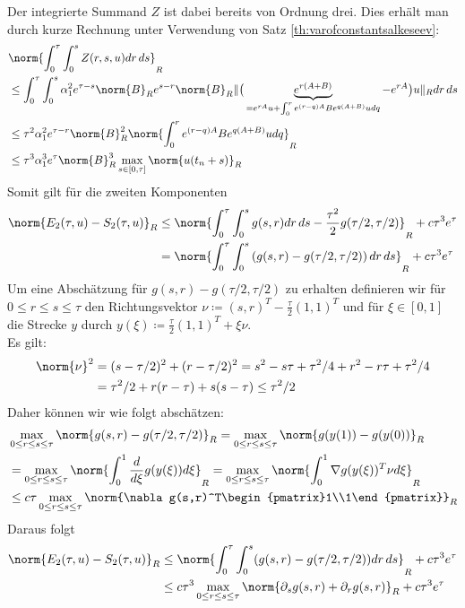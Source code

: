 Der integrierte Summand $Z$ ist dabei bereits von Ordnung drei. Dies erhält man durch kurze Rechnung unter Verwendung von Satz \ref{th:varofconstantsalkeseev}:
\begin{align*}
&\norm{\int_0^\tau\int_0^s Z(r,s,u)dr\,ds}_R\\
&\le \int_0^\tau\int_0^s \alpha_1^2e^{\tau-s}\norm{B}_Re^{s-r}\norm{B}_R\lVert\big(\underbrace{e^{r(A+B)}}_{=e^{rA}u+\int_0^r e^{(r-q)A}Be^{q(A+B)}udq}-e^{rA}\big)u\rVert_Rdr\,ds\\
&\le \tau^2\alpha_1^2e^{\tau-r}\norm{B}_R^2\norm{\int_0^re^{(r-q)A}Be^{q(A+B)}udq}_R\\
&\le \tau^3\alpha_1^3e^{\tau}\norm{B}_R^3\max_{s\in[0,\tau]}\norm{u(t_n+s)}_R
\end{align*} 
Somit gilt für die zweiten Komponenten
\begin{align*}
\norm{E_2(\tau,u)-S_2(\tau,u)}_R&\le \norm{\int_0^\tau\int_0^sg(s,r)dr\,ds-\frac{\tau^2}{2}g(\tau/2,\tau/2)}_R+c\tau^3e^\tau\\
&=\norm{\int_0^\tau\int_0^s\left(g(s,r)-g(\tau/2,\tau/2)\right)dr\,ds}_R+c\tau^3e^\tau
\end{align*}
Um eine Abschätzung für $g(s,r)-g(\tau/2,\tau/2)$ zu erhalten definieren wir für $0\le r\le s\le\tau$ den Richtungsvektor $\nu\coloneqq (s,r)^T-\frac{\tau}{2}(1,1)^T$ und für $\xi\in[0,1]$ die Strecke $y$ durch $y(\xi)\coloneqq \frac{\tau}{2}(1,1)^T+\xi \nu$.\\
Es gilt:
\begin{align*}
\norm{\nu}^2&=(s-\tau/2)^2+(r-\tau/2)^2=s^2-s\tau+\tau^2/4+r^2-r\tau+\tau^2/4\\
&=\tau^2/2+r(r-\tau)+s(s-\tau)\le \tau^2/2
\end{align*}
Daher können wir wie folgt abschätzen:
\begin{align*}
&\max_{0\le r\le s\le \tau}\norm{g(s,r)-g(\tau/2,\tau/2)}_R=\max_{0\le r\le s\le \tau}\norm{g(y(1))-g(y(0))}_R\\
&=\max_{0\le r\le s\le \tau}\norm{\int_0^1\frac{d}{d\xi}g(y(\xi))d\xi}_R=\max_{0\le r\le s\le \tau}\norm{\int_0^1\nabla g(y(\xi))^T\nu d\xi}_R\\
&\le c\tau \max_{0\le r\le s\le \tau}\norm{\nabla g(s,r)^T\begin{pmatrix}1\\1\end{pmatrix}}_R
\end{align*}
Daraus folgt
\begin{align*}
\norm{E_2(\tau,u)-S_2(\tau,u)}_R
&\le\norm{\int_0^\tau\int_0^s(g(s,r)-g(\tau/2,\tau/2))dr\,ds}_R+c\tau^3e^\tau\\
&\le c\tau^3\max_{0\le r\le s\le \tau}\norm{\partial_sg(s,r)+\partial_rg(s,r)}_R+c\tau^3e^\tau
\end{align*}
